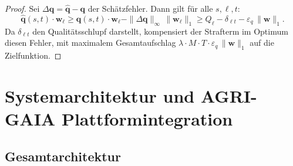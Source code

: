 ﻿\documentclass[12pt,a4paper]{article}
\theoremstyle{plain}
\theoremstyle{definition}
\begin{document}
	\begin{proof}
		Sei $\Delta\mathbf{q} = \hat{\mathbf{q}} - \mathbf{q}$ der
		Schätzfehler. Dann gilt für alle $s, \ell, t$:
		\[
		\hat{\mathbf{q}}(s,t)\cdot\mathbf{w}_\ell \geq
		\mathbf{q}(s,t)\cdot\mathbf{w}_\ell -
		\|\Delta\mathbf{q}\|_\infty\,\|\mathbf{w}_\ell\|_1
		\geq Q_\ell - \delta_{\ell t} - \varepsilon_q\,\|\mathbf{w}\|_1.
		\]
		Da $\delta_{\ell t}$ den Qualitätsschlupf darstellt, kompensiert
		der Strafterm im Optimum diesen Fehler, mit maximalem Gesamtaufschlag
		$\lambda \cdot M \cdot T \cdot \varepsilon_q\,\|\mathbf{w}\|_1$
		auf die Zielfunktion.
	\end{proof}
	
	\section{Systemarchitektur und AGRI-GAIA Plattformintegration}
	
	\subsection{Gesamtarchitektur}
	
\end{document}
